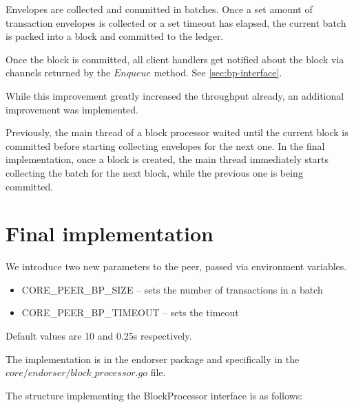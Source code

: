Envelopes are collected and committed in batches. Once a set amount of transaction envelopes is collected or a set timeout has elapsed, the current batch is packed into a block and committed to the ledger.

Once the block is committed, all client handlers get notified about the block via channels returned by the $Enqueue$ method. See \ref{sec:bp-interface}.

While this improvement greatly increased the throughput already, an additional improvement was implemented.

Previously, the main thread of a block processor waited until the current block is committed before starting collecting envelopes for the next one. In the final implementation, once a block is created, the main thread immediately starts collecting the batch for the next block, while the previous one is being committed.

\section{Final implementation}

We introduce two new parameters to the peer, passed via environment variables.

\begin{itemize}
  \item CORE\_PEER\_BP\_SIZE -- sets the number of transactions in a batch
  \item CORE\_PEER\_BP\_TIMEOUT -- sets the timeout
\end{itemize}

Default values are 10 and 0.25s respectively.

The implementation is in the endorser package and specifically in the
$core/endorser/block\_processor.go$ file.

\newpage
The structure implementing the BlockProcessor interface is as follows:

